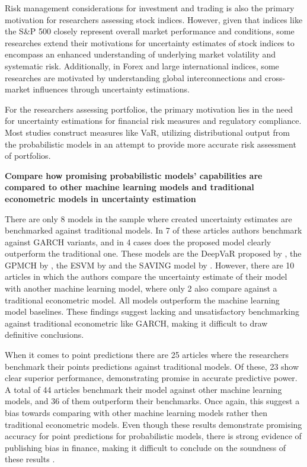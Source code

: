 Risk management considerations for investment and trading is also the primary motivation for researchers assessing stock indices. However, given that indices like the S\&P 500 closely represent overall market performance and conditions, some researches extend their motivations for uncertainty estimates of stock indices to encompass an enhanced understanding of underlying market volatility and systematic risk. Additionally, in Forex and large international indices, some researches are motivated by understanding global interconnections and cross-market influences through uncertainty estimations.

For the researchers assessing portfolios, the primary motivation lies in  the need for uncertainty estimations for financial risk measures and regulatory compliance. Most studies construct measures like VaR, utilizing distributional output from the probabilistic models in an attempt to provide more accurate risk assessment of portfolios.

\textbf{Compare how promising probabilistic models' capabilities are compared to other machine learning models and traditional econometric models in uncertainty estimation}\nopagebreak

There are only 8 models in the sample where created uncertainty estimates are benchmarked against traditional models. In 7 of these articles authors benchmark against GARCH variants, and in 4 cases does the proposed model clearly outperform the traditional one. These models are the DeepVaR proposed by \textcite{Fatouros2023DeepVaR}, the GPMCH by \textcite{Platanios2014gpr}, the ESVM by \textcite{Parker2021BayesianHeteroskedastic} and the SAVING model by \textcite{xing2019sentiment}. However, there are 10 articles in which the authors compare the uncertainty estimate of their model with another machine learning model, where only 2 also compare against a traditional econometric model. All models outperform the machine learning model baselines. These findings suggest lacking and unsatisfactory benchmarking against traditional econometric like GARCH, making it difficult to draw definitive conclusions.

When it comes to point predictions there are 25 articles where the researchers benchmark their points predictions against traditional models. Of these, 23 show clear superior performance, demonstrating promise in accurate predictive power. A total of 44 articles benchmark their model against other machine learning models, and 36 of them outperform their benchmarks. Once again, this suggest a bias towards comparing with other machine learning models rather then traditional econometric models. Even though these results demonstrate promising accuracy for point predictions for probabilistic models, there is strong evidence of publishing bias in finance, making it difficult to conclude on the soundness of these results \parencite{Kim2015SignificanceTI}.

